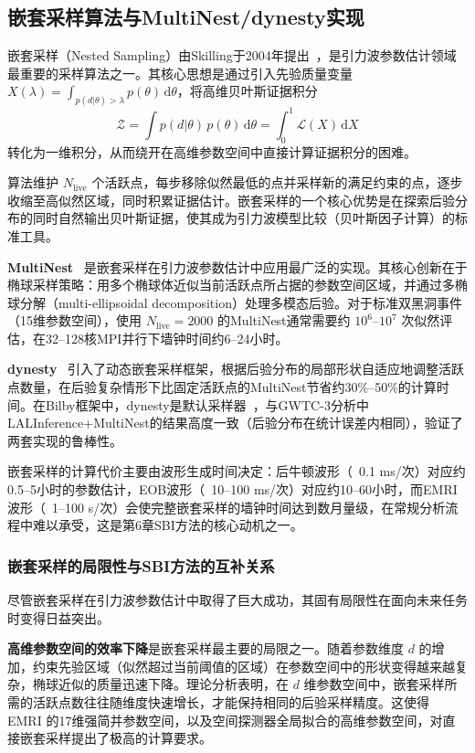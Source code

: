 \subsection{嵌套采样算法与MultiNest/dynesty实现}

嵌套采样（Nested Sampling）由Skilling于2004年提出~\cite{Skilling2004nested}，是引力波参数估计领域最重要的采样算法之一。其核心思想是通过引入先验质量变量 $X(\lambda) = \int_{p(d|\theta)>\lambda} p(\theta)\,\mathrm{d}\theta$，将高维贝叶斯证据积分
\begin{equation}
  \mathcal{Z} = \int p(d|\theta)\,p(\theta)\,\mathrm{d}\theta = \int_0^1 \mathcal{L}(X)\,\mathrm{d}X
\end{equation}
转化为一维积分，从而绕开在高维参数空间中直接计算证据积分的困难。

算法维护 $N_\mathrm{live}$ 个活跃点，每步移除似然最低的点并采样新的满足约束的点，逐步收缩至高似然区域，同时积累证据估计。嵌套采样的一个核心优势是在探索后验分布的同时自然输出贝叶斯证据，使其成为引力波模型比较（贝叶斯因子计算）的标准工具。

\textbf{MultiNest}~\cite{Feroz2009MultiNest} 是嵌套采样在引力波参数估计中应用最广泛的实现。其核心创新在于椭球采样策略：用多个椭球体近似当前活跃点所占据的参数空间区域，并通过多椭球分解（multi-ellipsoidal decomposition）处理多模态后验。对于标准双黑洞事件（15维参数空间），使用 $N_\mathrm{live} = 2000$ 的MultiNest通常需要约 $10^6$--$10^7$ 次似然评估，在32--128核MPI并行下墙钟时间约6--24小时。

\textbf{dynesty}~\cite{Speagle2020dynesty} 引入了动态嵌套采样框架，根据后验分布的局部形状自适应地调整活跃点数量，在后验复杂情形下比固定活跃点的MultiNest节省约30\%--50\%的计算时间。在Bilby框架中，dynesty是默认采样器~\cite{Ashton2019Bilby}，与GWTC-3分析中LALInference+MultiNest的结果高度一致（后验分布在统计误差内相同），验证了两套实现的鲁棒性。

嵌套采样的计算代价主要由波形生成时间决定：后牛顿波形（~0.1 ms/次）对应约0.5--5小时的参数估计，EOB波形（~10--100 ms/次）对应约10--60小时，而EMRI波形（~1--100 s/次）会使完整嵌套采样的墙钟时间达到数月量级，在常规分析流程中难以承受，这是第6章SBI方法的核心动机之一。

\subsubsection*{嵌套采样的局限性与SBI方法的互补关系}

尽管嵌套采样在引力波参数估计中取得了巨大成功，其固有局限性在面向未来任务时变得日益突出。

\textbf{高维参数空间的效率下降}是嵌套采样最主要的局限之一。随着参数维度 $d$ 的增加，约束先验区域（似然超过当前阈值的区域）在参数空间中的形状变得越来越复杂，椭球近似的质量迅速下降。理论分析表明，在 $d$ 维参数空间中，嵌套采样所需的活跃点数往往随维度快速增长，才能保持相同的后验采样精度。这使得 EMRI 的17维强简并参数空间，以及空间探测器全局拟合的高维参数空间，对直接嵌套采样提出了极高的计算要求。

